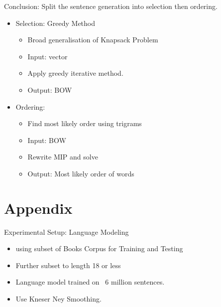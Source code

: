 \documentclass[]{beamer}
\newcommand{\x}{\tilde{x}}
\newcommand{\V}{\mathcal{V}}
\newcommand{\B}{\mathcal{B}}
\newcommand{\s}{w_{\blacktriangleright}}
\begin{document}


\begin{frame}{Conclusion: Split the sentence generation into selection then ordering.}
	\begin{itemize}
		\item<1->Selection: Greedy Method
		\begin{itemize}
			\item Broad generalisation of Knapsack Problem
			\item Input: vector
			\item Apply greedy iterative method.
			\item Output: BOW
		\end{itemize}
		\vfill
		\item<2->Ordering: 
		\begin{itemize}
			\item Find most likely order using trigrams
			\item Input: BOW
			\item Rewrite MIP and solve
			\item Output: Most likely order of words
		\end{itemize}
	\end{itemize}
\end{frame}

\section{Appendix}

\begin{frame}{Experimental Setup: Language Modeling}
	\begin{itemize}
		\item using subset of Books Corpus for Training and Testing
		\item<1-> Further subset to length 18 or less
		\vfill
		\item<2-> Language model trained on ~6 million sentences.
		\item<2-> Use Kneser Ney Smoothing. 
		
	\end{itemize}
\end{frame}



\newcommand{\vectorselectionproblemdefnalt}{Find the bag of vectors $\B$ (a multi-subset of $\V$), such that $\displaystyle \Sigma(\B)=\sum_{\x_a\in\B}\x_a$ we have  $\min d(\s,\Sigma(\B))$}
\end{document}
